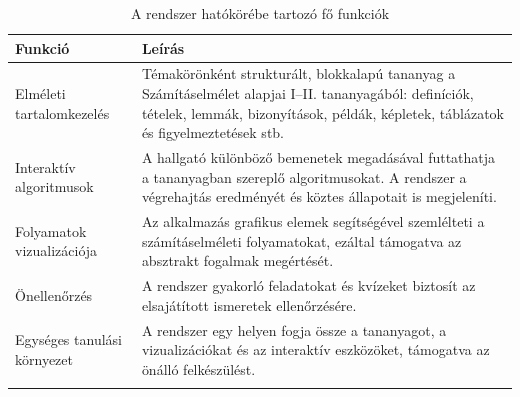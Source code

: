 \documentclass[12pt,a4paper]{report}
\begin{document}
\begin{table}[htbp] 
      \centering 
      \begin{tabularx}{\textwidth}{l X} 
            \toprule 
            \textbf{Funkció} & \textbf{Leírás} \\ 
            \midrule 
            Elméleti tartalomkezelés & 
                  Témakörönként strukturált, blokkalapú tananyag a Számításelmélet 
                  alapjai I--II. tananyagából: definíciók, tételek, lemmák, bizonyítások,
                  példák, képletek, táblázatok és figyelmeztetések stb. \\ 
                  \addlinespace
            Interaktív algoritmusok &
                  A hallgató különböző bemenetek megadásával futtathatja a tananyagban szereplő algoritmusokat. 
                  A rendszer a végrehajtás eredményét és köztes állapotait is megjeleníti. \\
                  \addlinespace
            Folyamatok vizualizációja &
                  Az alkalmazás grafikus elemek segítségével szemlélteti a számításelméleti folyamatokat, 
                  ezáltal támogatva az absztrakt fogalmak megértését. \\
                  \addlinespace
            Önellenőrzés &
                  A rendszer gyakorló feladatokat és kvízeket biztosít az elsajátított ismeretek ellenőrzésére. \\
            Egységes tanulási környezet &
                  A rendszer egy helyen fogja össze a tananyagot, a vizualizációkat és az interaktív eszközöket, 
                  támogatva az önálló felkészülést. \\
                  \addlinespace
            \bottomrule
      \end{tabularx}
      \caption{A rendszer hatókörébe tartozó fő funkciók}
      \label{tab:in_scope}
\end{table}
\end{document}
